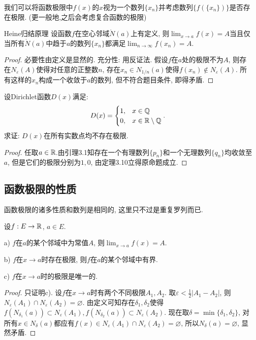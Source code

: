 我们可以将函数极限中$f(x)$的$x$视为一个数列$\{ x_n \}$并考虑数列$\{ f(\{ x_n \}) \}$是否存在极限. (更一般地,之后会考虑复合函数的极限)

\begin{theorem}{Heine归结原理}
	设函数$f$在空心邻域$\mathring{N}(a)$上有定义, 则$\lim_{x\to a} f(x)=A$当且仅当所有$\mathring{N}(a)$中趋于$a$的数列$\{ x_n \}$都满足$\lim_{n\to \infty} f(x_n) =A$.
\end{theorem}
\begin{proof}
	必要性由定义是显然的. 充分性: 用反证法. 假设$f$在$a$处的极限不为$A$, 则存在$N_{\varepsilon}(A)$使得对任意的正整数$n$, 存在$x_n \in N_{1/n}(a)$使得$f(x_n) \notin N_{\varepsilon}(A)$. 所有这样的$x_n$构成一个收敛于$a$的数列, 但不符合题目条件, 即得矛盾. 
\end{proof}

\begin{example}
	设Dirichlet函数$D(x)$满足: $$D(x) = \begin{cases}
		1,&x\in \mathbb{Q} \\ 0,& x \in \mathbb{R} \setminus \mathbb{Q}
	\end{cases}.$$
	求证: $D(x)$在所有实数点均不存在极限. 
\end{example}
\begin{proof}
	任取$a \in \mathbb{R}$.由引理3.1知存在一个有理数列$\{ p_n \}$和一个无理数列$\{ q_n \}$均收敛至$a$, 但是它们的极限分别为$1,0$, 由定理3.10立得原命题成立. 
\end{proof}

\subsection{函数极限的性质}

函数极限的诸多性质和数列是相同的, 这里只不过是重复罗列而已. 

\begin{proposition}{}
	设$f:E \to \mathbb{R}$, $a \in E$.
	
	a) $f$在$a$的某个邻域中为常值$A$, 则$\lim_{x\to a}f(x) = A$.
	
	b) $f$在$x\to a$时存在极限, 则$f$在$a$的某个邻域中有界.
	
	c) $f$在$x\to a$时的极限是唯一的.
\end{proposition}
\begin{proof}
	只证明c). 设$f$在$x\to a$时有两个不同极限$A_1, A_2$. 取$\varepsilon < \frac{1}{2} |A_1-A_2|$, 则$N_{\varepsilon}(A_1) \cap N_{\varepsilon}(A_2) = \varnothing$. 由定义可知存在$\delta _1,\delta _2$使得$f(N_{\delta _1}(a)) \subset N_{\varepsilon}(A_1), f(N_{\delta _2}(a)) \subset N_{\varepsilon}(A_2)$. 现在取$\delta = \min \{ \delta _1,\delta _2 \}$, 对所有$x\in N_{\delta}(a)$都应有$f(x) \in N_{\varepsilon}(A_1) \cap N_{\varepsilon}(A_2) = \varnothing$, 所以$N_{\delta}(a)=\varnothing$, 显然矛盾. 
\end{proof}

